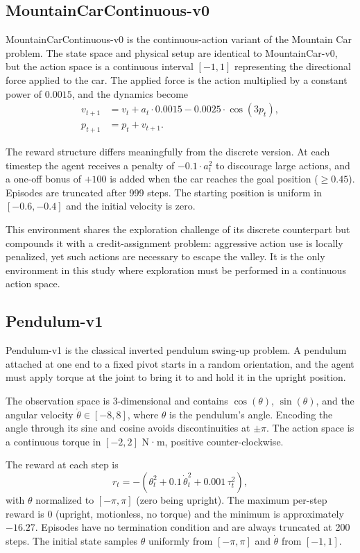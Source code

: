 \documentclass{article}
\begin{document}
\subsection{MountainCarContinuous-v0}
MountainCarContinuous-v0 is the continuous-action variant of the Mountain Car problem. The state space and physical setup are identical to MountainCar-v0, but the action space is a continuous interval $[-1, 1]$ representing the directional force applied to the car. The applied force is the action multiplied by a constant power of $0.0015$, and the dynamics become
\begin{align}
v_{t+1} &= v_t + a_t \cdot 0.0015 - 0.0025 \cdot \cos(3 p_t), \\
p_{t+1} &= p_t + v_{t+1}.
\end{align}

The reward structure differs meaningfully from the discrete version. At each timestep the agent receives a penalty of $-0.1 \cdot a_t^2$ to discourage large actions, and a one-off bonus of $+100$ is added when the car reaches the goal position ($\geq 0.45$). Episodes are truncated after 999 steps. The starting position is uniform in $[-0.6, -0.4]$ and the initial velocity is zero.

This environment shares the exploration challenge of its discrete counterpart but compounds it with a credit-assignment problem: aggressive action use is locally penalized, yet such actions are necessary to escape the valley. It is the only environment in this study where exploration must be performed in a continuous action space.

\subsection{Pendulum-v1}
Pendulum-v1 is the classical inverted pendulum swing-up problem. A pendulum attached at one end to a fixed pivot starts in a random orientation, and the agent must apply torque at the joint to bring it to and hold it in the upright position.




The observation space is 3-dimensional and contains $\cos(\theta)$, $\sin(\theta)$, and the angular velocity $\dot{\theta} \in [-8, 8]$, where $\theta$ is the pendulum's angle. Encoding the angle through its sine and cosine avoids discontinuities at $\pm\pi$. The action space is a continuous torque in $[-2, 2]$ N·m, positive counter-clockwise.

The reward at each step is
\[
r_t = -\left(\theta_t^2 + 0.1\,\dot{\theta}_t^2 + 0.001\,\tau_t^2\right),
\]
with $\theta$ normalized to $[-\pi, \pi]$ (zero being upright). The maximum per-step reward is $0$ (upright, motionless, no torque) and the minimum is approximately $-16.27$. Episodes have no termination condition and are always truncated at 200 steps. The initial state samples $\theta$ uniformly from $[-\pi, \pi]$ and $\dot{\theta}$ from $[-1, 1]$.
\end{document}
